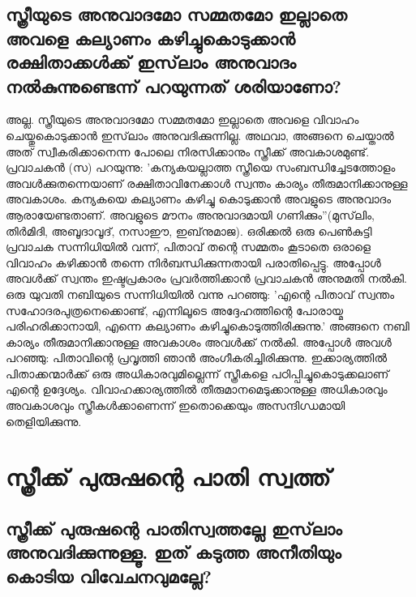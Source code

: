  \section{സ്ത്രീയുടെ അനുവാദമോ സമ്മതമോ ഇല്ലാതെ അവളെ കല്യാണം കഴിച്ചുകൊടുക്കാന്‍ രക്ഷിതാക്കള്‍ക്ക് ഇസ്‌ലാം അനുവാദം നല്‍കുന്നുണ്ടെന്ന് പറയുന്നത് ശരിയാണോ?}

 അല്ല. സ്ത്രീയുടെ അനുവാദമോ സമ്മതമോ ഇല്ലാതെ അവളെ വിവാഹം ചെയ്തുകൊടുക്കാന്‍ ഇസ്‌ലാം അനുവദിക്കുന്നില്ല. അഥവാ, അങ്ങനെ ചെയ്താല്‍ അത് സ്വീകരിക്കാനെന്ന പോലെ നിരസിക്കാനും സ്ത്രീക്ക് അവകാശമുണ്ട്.
പ്രവാചകന്‍ (സ) പറയുന്നു: 'കന്യകയല്ലാത്ത സ്ത്രീയെ സംബന്ധിച്ചേടത്തോളം അവള്‍ക്കുതന്നെയാണ് രക്ഷിതാവിനേക്കാള്‍ സ്വന്തം കാര്യം തീരുമാനിക്കാനുള്ള അവകാശം. കന്യകയെ കല്യാണം കഴിച്ചു കൊടുക്കാന്‍ അവളുടെ അനുവാദം ആരായേണ്ടതാണ്. അവളുടെ മൗനം അനുവാദമായി ഗണിക്കും''(മുസ്‌ലിം, തിര്‍മിദി, അബൂദാവൂദ്, നസാഈ, ഇബ്‌നുമാജ).
ഒരിക്കല്‍ ഒരു പെണ്‍കുട്ടി പ്രവാചക സന്നിധിയില്‍ വന്ന്, പിതാവ് തന്റെ സമ്മതം കൂടാതെ ഒരാളെ വിവാഹം കഴിക്കാന്‍ തന്നെ നിര്‍ബന്ധിക്കുന്നതായി പരാതിപ്പെട്ടു. അപ്പോള്‍ അവള്‍ക്ക് സ്വന്തം ഇഷ്ടപ്രകാരം പ്രവര്‍ത്തിക്കാന്‍ പ്രവാചകന്‍ അനുമതി നല്‍കി.
ഒരു യുവതി നബിയുടെ സന്നിധിയില്‍ വന്നു പറഞ്ഞു: 'എന്റെ പിതാവ് സ്വന്തം സഹോദരപുത്രനെക്കൊണ്ട്, എന്നിലൂടെ അദ്ദേഹത്തിന്റെ പോരായ്മ പരിഹരിക്കാനായി, എന്നെ കല്യാണം കഴിച്ചുകൊടുത്തിരിക്കുന്നു.' അങ്ങനെ നബി കാര്യം തീരുമാനിക്കാനുള്ള അവകാശം അവള്‍ക്ക് നല്‍കി. അപ്പോള്‍ അവള്‍ പറഞ്ഞു: പിതാവിന്റെ പ്രവൃത്തി ഞാന്‍ അംഗീകരിച്ചിരിക്കുന്നു. ഇക്കാര്യത്തില്‍ പിതാക്കന്മാര്‍ക്ക് ഒരു അധികാരവുമില്ലെന്ന് സ്ത്രീകളെ പഠിപ്പിച്ചുകൊടുക്കലാണ് എന്റെ ഉദ്ദേശ്യം.
വിവാഹക്കാര്യത്തില്‍ തീരുമാനമെടുക്കാനുള്ള അധികാരവും അവകാശവും സ്ത്രീകള്‍ക്കാണെന്ന് ഇതൊക്കെയും അസന്ദിഗ്ധമായി തെളിയിക്കുന്നു.
\chapter{സ്ത്രീക്ക് പുരുഷന്റെ പാതി സ്വത്ത് }
  \section{സ്ത്രീക്ക് പുരുഷന്റെ പാതിസ്വത്തല്ലേ ഇസ്‌ലാം അനുവദിക്കുന്നുള്ളൂ. ഇത് കടുത്ത അനീതിയും കൊടിയ വിവേചനവുമല്ലേ?}

